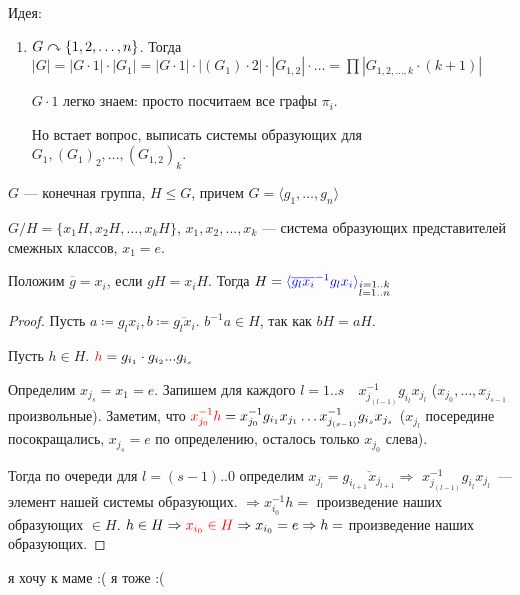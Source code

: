 Идея: 
\begin{enumerate}
    \item $G \curvearrowright \{1, 2, \ldots, n\}$. Тогда $|G| = |G \cdot 1| \cdot |G_1| = |G\cdot 1| \cdot |(G_1)\cdot 2| \cdot |G_{1,2}| \cdot \ldots = \prod |G_{1,2,\ldots,k} \cdot (k+1)|$

        $G\cdot 1$ легко знаем: просто посчитаем все графы  $\pi_i$. 

        Но встает вопрос, выписать системы образующих для $G_1, (G_1)_2, \ldots, (G_{1,2})_k$.
\end{enumerate}
\begin{lemma}
    $G$ --- конечная группа,  $H \le G$, причем $G = \langle g_1, \ldots, g_n \rangle$

    $G / H = \{x_1H, x_2H,\ldots, x_kH\}$, $x_1, x_2,\ldots, x_k$ --- система образующих представителей смежных классов, $x_1 = e$.

    Положим $\overline{g} = x_i$, если  $gH = x_iH$. Тогда  $H = {\color{blue}\langle \overline{g_lx_i}^{-1} g_l x_i \rangle}_{\substack{i = 1..k\\ l=1..n}}$
\end{lemma}
\begin{proof}
    Пусть $a \coloneqq g_lx_i, b \coloneqq \overline{g_lx_i}$.  $b^{-1}a \in H$, так как  $bH=aH$.

    Пусть  $h \in H$. ${\color{red}h} = g_{i_1} \cdot g_{i_2} ... g_{i_s}$

    Определим $x_{j_s} = x_1 = e$. Запишем для каждого $l=1..s \quad x_{j_{(l-1)}}^{-1}g_{i_l}x_{j_l}$ ($x_{j_0}, \ldots, x_{j_{s-1}}$ произвольные). Заметим, что  ${\color{red}x_{j_0}^{-1}h} = x_{j_0}^{-1}g_{i_1} x_{j_1} \ldots x_{j_{(s - 1)}}^{-1} g_{i_s} x_{j_s}$ ($x_{j_l}$ посередине посокращались, $x_{j_s} = e$ по определению, осталось только $x_{j_0}$ слева).

    Тогда по очереди для $l=(s\!-\!1)..0$ определим $x_{j_l} = \overline{g_{i_{l+1}} x_{j_{l+1}}} \Rightarrow$ {\color{blue}$x_{j_{(l-1)}}^{-1}g_{i_{l}} x_{j_{l}}$}~--- элемент нашей системы образующих.
    $\Rightarrow x_{i_0}^{-1}h = $ произведение наших образующих $\in H$.
    $h \in H \Rightarrow {\color{red}x_{i_0} \in H} \Rightarrow x_{i_0} = e \Rightarrow h = $ произведение наших образующих.
\end{proof}

я хочу к маме :( я тоже :(

